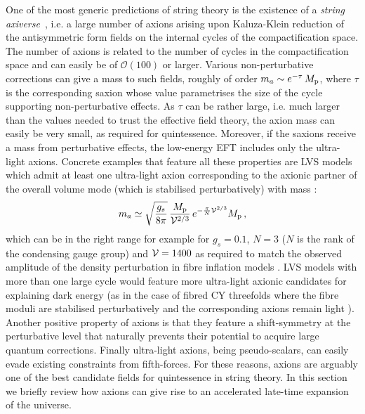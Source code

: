 \documentclass[11pt,a4paper]{article}
\newcommand{\be}{\begin{equation}}
\newcommand{\ee}{\end{equation}}
\newcommand{\vo}{\mathcal{V}}
\def\vo{{{\cal{V}}}}
\newcommand{\mc}{\mathcal}
\begin{document}
\begin{itemize}
One of the most generic predictions of string theory is the existence of a \textit{string axiverse}~\cite{Svrcek:2006yi, Arvanitaki:2009fg, Cicoli:2012sz}, i.e. a large number of axions arising upon Kaluza-Klein reduction of the antisymmetric form fields on the internal cycles of the compactification space. The number of axions is related to the number of cycles in the compactification space and can easily be of $\mc{O}\left(100\right)$ or larger. Various non-perturbative corrections can give a mass to such fields, roughly of order $m_a \sim e^{-\tau}\,M_{\rm p}$, where $\tau$ is the corresponding saxion whose value parametrises the size of the cycle supporting non-perturbative effects. As $\tau$ can be rather large, i.e. much larger than the values needed to trust the effective field theory, the axion mass can easily be very small, as required for quintessence. Moreover, if the saxions receive a mass from perturbative effects, the low-energy EFT includes only the ultra-light axions. Concrete examples that feature all these properties are LVS models which admit at least one ultra-light axion corresponding to the axionic partner of the overall volume mode (which is stabilised perturbatively) with mass \cite{Conlon:2005ki, Cicoli:2017zbx}: 
\be 
m_a \simeq \sqrt{\frac{g_s}{8\pi}}\,\frac{M_{\rm p}}{\vo^{2/3}}\,e^{-\frac{\pi}{N} \vo^{2/3}} M_{\rm p} \,,
\ee
which can be in the right range for example for $g_s=0.1$, $N=3$ ($N$ is the rank of the condensing gauge group) and $\vo=1400$ as required to match the observed amplitude of the density perturbation in fibre inflation models \cite{Cicoli:2008gp}. LVS models with more than one large cycle would feature more ultra-light axionic candidates for explaining dark energy (as in the case of fibred CY threefolds where the fibre moduli are stabilised perturbatively and the corresponding axions remain light \cite{Cicoli:2008gp}). Another positive property of axions is that they feature a shift-symmetry at the perturbative level that naturally prevents their potential to acquire large quantum corrections. Finally ultra-light axions, being pseudo-scalars, can easily evade existing constraints from fifth-forces. For these reasons, axions are arguably one of the best candidate fields for quintessence in string theory. In this section we briefly review how axions can give rise to an accelerated late-time expansion of the universe.


\end{itemize}
\end{document}
